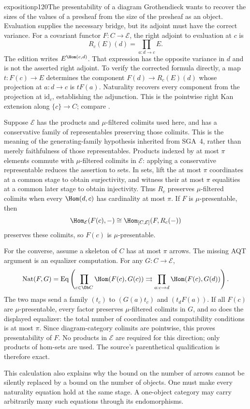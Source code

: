 \begin{dcomment}{exposition}{p120}{The presentability of a diagram}
Grothendieck wants to recover the sizes of the values of a presheaf from the size of the presheaf as an object. Evaluation supplies the necessary bridge, but its adjoint must have the correct variance. For a covariant functor $F:C\to\mathcal E$, the right adjoint to evaluation at $c$ is
\[
 R_c(E)(d)=\prod_{a:d\to c}E.
\]
The edition writes $E^{\Hom(c,d)}$. That expression has the opposite variance in $d$ and is not the asserted right adjoint. To verify the corrected formula directly, a map $t:F(c)\to E$ determines the component $F(d)\to R_c(E)(d)$ whose projection at $a:d\to c$ is $tF(a)$. Naturality recovers every component from the projection at $\mathrm{id}_c$, establishing the adjunction. This is the pointwise right Kan extension along $\{c\}\to C$; compare \citet[Proposition 6.1.5 and Theorem 6.2.1]{Riehl2016}.

Suppose $\mathcal E$ has the products and $\mu$-filtered colimits used here, and has a conservative family of representables preserving those colimits. This is the meaning of the generating-family hypothesis inherited from SGA~4, rather than merely faithfulness of those representables. Products indexed by at most $\pi$ elements commute with $\mu$-filtered colimits in $\mathcal E$: applying a conservative representable reduces the assertion to sets. In sets, lift the at most $\pi$ coordinates at a common stage to obtain surjectivity, and witness their at most $\pi$ equalities at a common later stage to obtain injectivity. Thus $R_c$ preserves $\mu$-filtered colimits when every $\Hom(d,c)$ has cardinality at most $\pi$. If $F$ is $\mu$-presentable, then
\[
 \Hom_{\mathcal E}(F(c),-)
   \cong\Hom_{[C,\mathcal E]}(F,R_c(-))
\]
preserves these colimits, so $F(c)$ is $\mu$-presentable.

For the converse, assume a skeleton of $C$ has at most $\pi$ arrows. The missing AQT argument is an equalizer computation. For any $G:C\to\mathcal E$,
\[
 \operatorname{Nat}(F,G)=
 \operatorname{Eq}\left(
 \prod_{c\in\Ob C}\Hom(F(c),G(c))
 \rightrightarrows
 \prod_{a:c\to d}\Hom(F(c),G(d))\right).
\]
The two maps send a family $(t_c)$ to $(G(a)t_c)$ and $(t_dF(a))$. If all $F(c)$ are $\mu$-presentable, every factor preserves $\mu$-filtered colimits in $G$, and so does the displayed equalizer: the total number of coordinates and compatibility conditions is at most $\pi$. Since diagram-category colimits are pointwise, this proves presentability of $F$. No products in $\mathcal E$ are required for this direction; only products of hom-sets are used. The source's parenthetical qualification is therefore exact.

This calculation also explains why the bound on the number of arrows cannot be silently replaced by a bound on the number of objects. One must make every naturality equation hold at the same stage. A one-object category may carry arbitrarily many such equations through its endomorphisms.
\end{dcomment}

